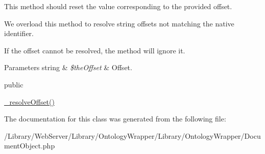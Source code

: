 This method should reset the value corresponding to the provided offset.

We overload this method to resolve string offsets not matching the native identifier.

If the offset cannot be resolved, the method will ignore it.


\begin{DoxyParams}[1]{Parameters}
string & {\em \$the\-Offset} & Offset.\\
\hline
\end{DoxyParams}
public

\hyperlink{class_ontology_wrapper_1_1_document_object_a685ca256ab347244104f444cc38362e5}{\-\_\-resolve\-Offset()} 

The documentation for this class was generated from the following file\-:\begin{DoxyCompactItemize}
\item 
/\-Library/\-Web\-Server/\-Library/\-Ontology\-Wrapper/\-Library/\-Ontology\-Wrapper/Document\-Object.\-php\end{DoxyCompactItemize}
